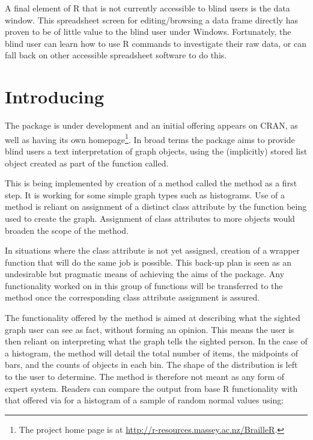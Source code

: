 A final element of R that is not currently accessible to blind users is the data window. This spreadsheet screen for editing/browsing a data frame directly  has proven to be of little value to the blind user under Windows. Fortunately, the blind user can learn how to use R commands to investigate their raw data, or can fall back on other accessible spreadsheet software to do this.



\section{Introducing }

The  package is under development \citep{BrailleR} and an initial offering appears on CRAN, as well as having its own homepage\footnote{The  project home page is at \url{http://r-resources.massey.ac.nz/BrailleR}.}.  In broad terms the package aims to provide  blind users a text interpretation of graph objects, using the (implicitly) stored list object created as part of the function called. 

This is being implemented by creation of a method called the  method as a first step. It is working for some simple graph types such as histograms. Use of a method is reliant on assignment of a distinct class attribute by the function being used to create the graph. Assignment of class attributes to more objects would broaden the scope of the  method.

In situations where the class attribute is not yet assigned, creation of a wrapper function that will do the same job is possible. This back-up plan is seen as an undesirable but pragmatic means of achieving the aims of the package. Any functionality worked on in this group of functions will be transferred to the method once the corresponding class attribute assignment is assured.

The functionality offered by the  method is aimed at describing what the sighted graph user can see as fact, without forming an opinion. This means the user is then reliant on interpreting what the graph tells the sighted person. In the case of a histogram, the  method will detail the total number of items, the midpoints of bars, and the counts of objects in each bin. The shape of the distribution is left to the user to determine. The method is therefore not meant as any form of expert system. Readers can compare the output from base R functionality with that offered via  for a histogram of a sample of random normal values using:

